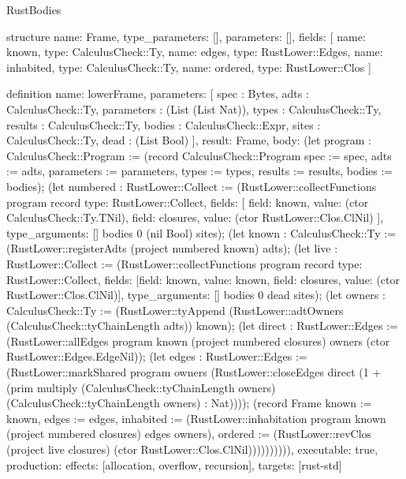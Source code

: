 \begin{lexlean}{RustBodies}
\begin{semanticmodule}
structure{
  name: Frame,
  type_parameters: [],
  parameters: [],
  fields: [
    {name: known, type: CalculusCheck::Ty},
    {name: edges, type: RustLower::Edges},
    {name: inhabited, type: CalculusCheck::Ty},
    {name: ordered, type: RustLower::Clos}
  ]
}

definition{
  name: lowerFrame,
  parameters: [
    spec : Bytes,
    adts : CalculusCheck::Ty,
    parameters : (List (List Nat)),
    types : CalculusCheck::Ty,
    results : CalculusCheck::Ty,
    bodies : CalculusCheck::Expr,
    sites : CalculusCheck::Ty,
    dead : (List Bool)
  ],
  result: Frame,
  body: (let program : CalculusCheck::Program := (record CalculusCheck::Program {spec := spec, adts := adts, parameters := parameters, types := types, results := results, bodies := bodies}); (let numbered : RustLower::Collect := (RustLower::collectFunctions program record{
    type: RustLower::Collect,
    fields: [
      {field: known, value: (ctor CalculusCheck::Ty.TNil)},
      {field: closures, value: (ctor RustLower::Clos.ClNil)}
    ],
    type_arguments: []
  } bodies 0 (nil Bool) sites); (let known : CalculusCheck::Ty := (RustLower::registerAdts (project numbered known) adts); (let live : RustLower::Collect := (RustLower::collectFunctions program record{
    type: RustLower::Collect,
    fields: [{field: known, value: known}, {field: closures, value: (ctor RustLower::Clos.ClNil)}],
    type_arguments: []
  } bodies 0 dead sites); (let owners : CalculusCheck::Ty := (RustLower::tyAppend (RustLower::adtOwners (CalculusCheck::tyChainLength adts)) known); (let direct : RustLower::Edges := (RustLower::allEdges program known (project numbered closures) owners (ctor RustLower::Edges.EdgeNil)); (let edges : RustLower::Edges := (RustLower::markShared program owners (RustLower::closeEdges direct (1 + (prim multiply (CalculusCheck::tyChainLength owners) (CalculusCheck::tyChainLength owners) : Nat)))); (record Frame {known := known, edges := edges, inhabited := (RustLower::inhabitation program known (project numbered closures) edges owners), ordered := (RustLower::revClos (project live closures) (ctor RustLower::Clos.ClNil))})))))))),
  executable: true,
  production: {effects: [allocation, overflow, recursion], targets: [rust-std]}
}


\end{semanticmodule}
\end{lexlean}
